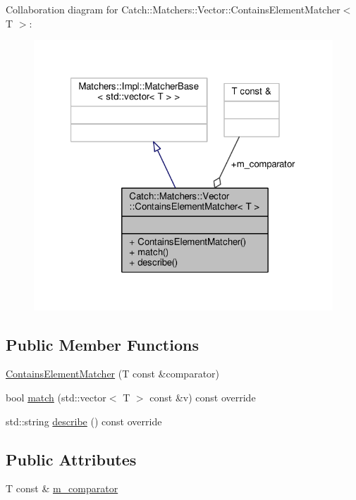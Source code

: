 Collaboration diagram for Catch\-:\-:Matchers\-:\-:Vector\-:\-:Contains\-Element\-Matcher$<$ T $>$\-:
\nopagebreak
\begin{figure}[H]
\begin{center}
\leavevmode
\includegraphics[width=321pt]{struct_catch_1_1_matchers_1_1_vector_1_1_contains_element_matcher__coll__graph}
\end{center}
\end{figure}
\subsection*{Public Member Functions}
\begin{DoxyCompactItemize}
\item 
\hyperlink{struct_catch_1_1_matchers_1_1_vector_1_1_contains_element_matcher_a6a05740b5d3f89fac8de84ac0cff7b93}{Contains\-Element\-Matcher} (T const \&comparator)
\item 
bool \hyperlink{struct_catch_1_1_matchers_1_1_vector_1_1_contains_element_matcher_a6a4be6e5642e267433d370649beb0fac}{match} (std\-::vector$<$ T $>$ const \&v) const override
\item 
std\-::string \hyperlink{struct_catch_1_1_matchers_1_1_vector_1_1_contains_element_matcher_aea3b674389a0afd82af6ba4b10f86ae6}{describe} () const override
\end{DoxyCompactItemize}
\subsection*{Public Attributes}
\begin{DoxyCompactItemize}
\item 
T const \& \hyperlink{struct_catch_1_1_matchers_1_1_vector_1_1_contains_element_matcher_ab7eada6c4bbce1d21b44773262f9cb23}{m\-\_\-comparator}
\end{DoxyCompactItemize}


